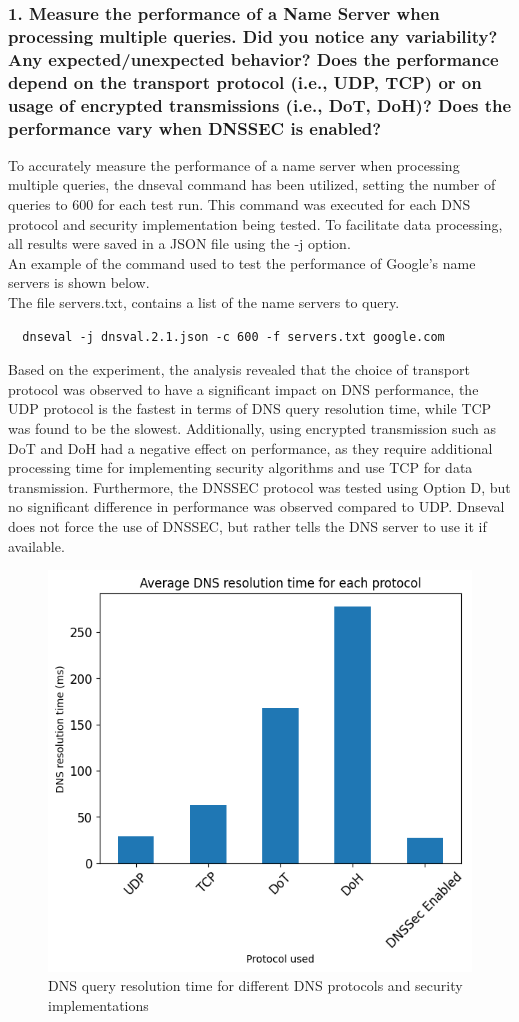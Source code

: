 \documentclass[eng]{class}
\begin{document}
\subsubsection*{1. Measure the performance of a Name Server when processing multiple queries. Did
  you notice any variability? Any expected/unexpected behavior? Does the
  performance depend on the transport protocol (i.e., UDP, TCP) or on usage of
  encrypted transmissions (i.e., DoT, DoH)? Does the performance vary when
  DNSSEC is enabled?}
To accurately measure the performance of a name server when processing multiple queries,
the dnseval command has been utilized, setting the number of queries to 600 for each test run.
This command was executed for each DNS protocol and security implementation being tested.
To facilitate data processing, all results were saved in a JSON file using the -j option.\\
An example of the command used to test the performance of Google's name servers is shown below.\\
The file servers.txt, contains a list of the name servers to query.
\begin{lstlisting}
  dnseval -j dnsval.2.1.json -c 600 -f servers.txt google.com
\end{lstlisting}
Based on the experiment, the analysis revealed that  the choice of transport protocol was observed to have a significant impact on DNS performance,
the UDP protocol is the fastest in terms of DNS query resolution time, while TCP was found to be the slowest.
Additionally, using encrypted transmission such as DoT and DoH had a negative effect on performance,
as they require additional processing time for implementing security algorithms and use TCP for data transmission.
Furthermore, the DNSSEC protocol was tested using Option D, but no significant difference in performance was observed compared to UDP.
Dnseval does not force the use of DNSSEC, but rather tells the DNS server to use it if available.

\begin{figure}[H]
  \centering
  \includegraphics[width=.7\columnwidth]{images/avgLat2.1.png}
  \caption{DNS query resolution time for different DNS protocols and security implementations}
  \label{fig-5}
\end{figure}
\end{document}

